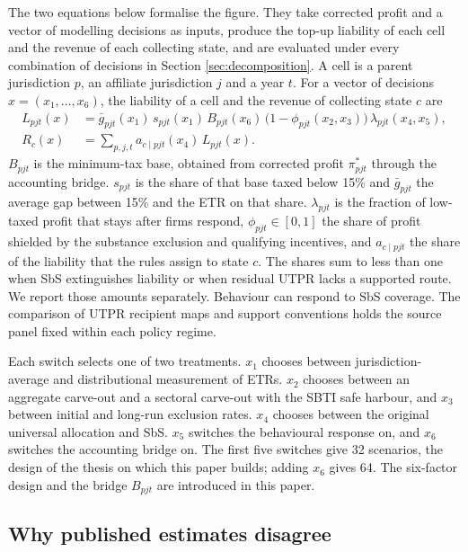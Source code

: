 \documentclass[11pt,a4paper]{article}
\begin{document}
The two equations below formalise the figure. They take corrected profit and a vector of modelling decisions as inputs, produce the top-up liability of each cell and the revenue of each collecting state, and are evaluated under every combination of decisions in Section \ref{sec:decomposition}. A cell is a parent jurisdiction $p$, an affiliate jurisdiction $j$ and a year $t$. For a vector of decisions $x=(x_1,\dots,x_6)$, the liability of a cell and the revenue of collecting state $c$ are
\begin{align}
L_{pjt}(x) &= \bar g_{pjt}(x_1)\,s_{pjt}(x_1)\,B_{pjt}(x_6)\,\bigl(1-\phi_{pjt}(x_2,x_3)\bigr)\,\lambda_{pjt}(x_4,x_5), \label{eq:liability}\\
R_c(x) &= \sum_{p,j,t} a_{c\mid pjt}(x_4)\,L_{pjt}(x). \label{eq:revenue}
\end{align}
$B_{pjt}$ is the minimum-tax base, obtained from corrected profit $\pi^{*}_{pjt}$ through the accounting bridge. $s_{pjt}$ is the share of that base taxed below 15\% and $\bar g_{pjt}$ the average gap between 15\% and the ETR on that share. $\lambda_{pjt}$ is the fraction of low-taxed profit that stays after firms respond, $\phi_{pjt}\in[0,1]$ the share of profit shielded by the substance exclusion and qualifying incentives, and $a_{c\mid pjt}$ the share of the liability that the rules assign to state $c$. The shares sum to less than one when SbS extinguishes liability or when residual UTPR lacks a supported route. We report those amounts separately. Behaviour can respond to SbS coverage. The comparison of UTPR recipient maps and support conventions holds the source panel fixed within each policy regime.

Each switch selects one of two treatments. $x_1$ chooses between jurisdiction-average and distributional measurement of ETRs. $x_2$ chooses between an aggregate carve-out and a sectoral carve-out with the SBTI safe harbour, and $x_3$ between initial and long-run exclusion rates. $x_4$ chooses between the original universal allocation and SbS. $x_5$ switches the behavioural response on, and $x_6$ switches the accounting bridge on. The first five switches give 32 scenarios, the design of the thesis on which this paper builds; adding $x_6$ gives 64. The six-factor design and the bridge $B_{pjt}$ are introduced in this paper.

\subsection{Why published estimates disagree}\label{sec:disagree}
\end{document}
